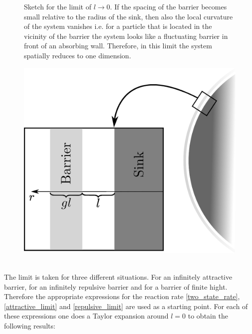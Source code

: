 \begin{minipage}[t]{.372 \textwidth}
    \vspace{0.5 cm}
    \begin{figure}[H]
        \caption{Sketch for the limit of $l\rightarrow 0$. If the spacing of the barrier becomes small relative to the radius of the sink, then also the local curvature of the system vanishes i.e. for a particle that is located in the vicinity of the barrier the system looks like a fluctuating barrier in front of an absorbing wall. Therefore, in this limit the system spatially reduces to one dimension.
    \label{fig:llimit_skizze}}
    \end{figure}
\end{minipage}\hspace{0.04 \textwidth}\begin{minipage}[t]{.608 \textwidth}
    \begin{figure}[H]
        \includegraphics[width = 1 \textwidth]{plots/tlimit.eps}
    \end{figure}
\end{minipage}
\vspace{0.5 cm} \\
The limit is taken for three different situations. For an infinitely attractive barrier, for an infinitely repulsive barrier and for a barrier of finite hight. Therefore the appropriate expressions for the reaction rate \eqref{two_state_rate}, \eqref{attractive_limit} and \eqref{repulsive_limit} are used as a starting point. For each of these expressions one does a Taylor expansion around $l=0$ to obtain the following results:
